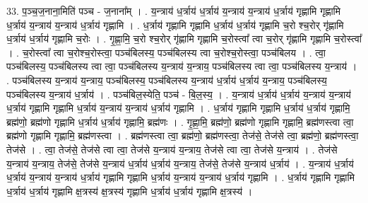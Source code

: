 \documentclass[17pt]{extarticle}
\begin{document}
33. प॒ञ्च॒ज॒नाना॒मिति॑ पञ्च - ज॒नाना᳚म् । . य॒न्त्राय॑ ध॒र्त्राय॑ ध॒र्त्राय॑ य॒न्त्राय॑ य॒न्त्राय॑ ध॒र्त्राय॑ गृह्णामि गृह्णामि ध॒र्त्राय॑ य॒न्त्राय॑ य॒न्त्राय॑ ध॒र्त्राय॑ गृह्णामि । . ध॒र्त्राय॑ गृह्णामि गृह्णामि ध॒र्त्राय॑ ध॒र्त्राय॑ गृह्णामि च॒रो श्च॒रोर् गृ॑ह्णामि ध॒र्त्राय॑ ध॒र्त्राय॑ गृह्णामि च॒रोः । . गृ॒ह्णा॒मि॒ च॒रो श्च॒रोर् गृ॑ह्णामि गृह्णामि च॒रोस्त्वा᳚ त्वा च॒रोर् गृ॑ह्णामि गृह्णामि च॒रोस्त्वा᳚ । . च॒रोस्त्वा᳚ त्वा च॒रोश्च॒रोस्त्वा॒ पञ्च॑बिलस्य॒ पञ्च॑बिलस्य त्वा च॒रोश्च॒रोस्त्वा॒ पञ्च॑बिलय । . त्वा॒ पञ्च॑बिलस्य॒ पञ्च॑बिलस्य त्वा त्वा॒ पञ्च॑बिलस्य य॒न्त्राय॑ य॒न्त्राय॒ पञ्च॑बिलस्य त्वा त्वा॒ पञ्च॑बिलस्य य॒न्त्राय॑ । . पञ्च॑बिलस्य य॒न्त्राय॑ य॒न्त्राय॒ पञ्च॑बिलस्य॒ पञ्च॑बिलस्य य॒न्त्राय॑ ध॒र्त्राय॑ ध॒र्त्राय॑ य॒न्त्राय॒ पञ्च॑बिलस्य॒ पञ्च॑बिलस्य य॒न्त्राय॑ ध॒र्त्राय॑ । . पञ्च॑बिल॒स्येति॒ पञ्च॑ - बि॒ल॒स्य॒ । . य॒न्त्राय॑ ध॒र्त्राय॑ ध॒र्त्राय॑ य॒न्त्राय॑ य॒न्त्राय॑ ध॒र्त्राय॑ गृह्णामि गृह्णामि ध॒र्त्राय॑ य॒न्त्राय॑ य॒न्त्राय॑ ध॒र्त्राय॑ गृह्णामि । . ध॒र्त्राय॑ गृह्णामि गृह्णामि ध॒र्त्राय॑ ध॒र्त्राय॑ गृह्णामि॒ ब्रह्म॑णो॒ ब्रह्म॑णो गृह्णामि ध॒र्त्राय॑ ध॒र्त्राय॑ गृह्णामि॒ ब्रह्म॑णः । . गृ॒ह्णा॒मि॒ ब्रह्म॑णो॒ ब्रह्म॑णो गृह्णामि गृह्णामि॒ ब्रह्म॑णस्त्वा त्वा॒ ब्रह्म॑णो गृह्णामि गृह्णामि॒ ब्रह्म॑णस्त्वा । . ब्रह्म॑णस्त्वा त्वा॒ ब्रह्म॑णो॒ ब्रह्म॑णस्त्वा॒ तेज॑से॒ तेज॑से त्वा॒ ब्रह्म॑णो॒ ब्रह्म॑णस्त्वा॒ तेज॑से । . त्वा॒ तेज॑से॒ तेज॑से त्वा त्वा॒ तेज॑से य॒न्त्राय॑ य॒न्त्राय॒ तेज॑से त्वा त्वा॒ तेज॑से य॒न्त्राय॑ । . तेज॑से य॒न्त्राय॑ य॒न्त्राय॒ तेज॑से॒ तेज॑से य॒न्त्राय॑ ध॒र्त्राय॑ ध॒र्त्राय॑ य॒न्त्राय॒ तेज॑से॒ तेज॑से य॒न्त्राय॑ ध॒र्त्राय॑ । . य॒न्त्राय॑ ध॒र्त्राय॑ ध॒र्त्राय॑ य॒न्त्राय॑ य॒न्त्राय॑ ध॒र्त्राय॑ गृह्णामि गृह्णामि ध॒र्त्राय॑ य॒न्त्राय॑ य॒न्त्राय॑ ध॒र्त्राय॑ गृह्णामि । . ध॒र्त्राय॑ गृह्णामि गृह्णामि ध॒र्त्राय॑ ध॒र्त्राय॑ गृह्णामि क्ष॒त्रस्य॑ क्ष॒त्रस्य॑ गृह्णामि ध॒र्त्राय॑ ध॒र्त्राय॑ गृह्णामि क्ष॒त्रस्य॑ । \newline
\end{document}
